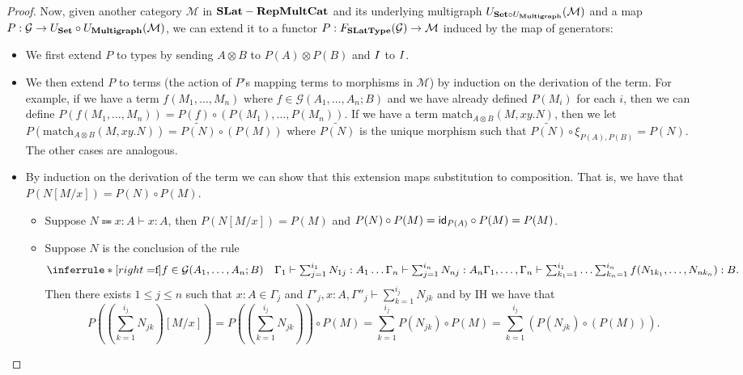 \begin{proof}
Now, given another category $\mathcal{M}$ in $\mathbf{SLat}-\mathbf{RepMultCat}$ and its underlying multigraph $U_{\mathbf{Set} \circ U_{\mathbf{Multigraph}}}(\mathcal{M})$ and a map $P : \mathcal{G} \to U_{\mathbf{Set}} \circ U_{\mathbf{Multigraph}}(\mathcal{M})$,
we can extend it to a functor $P : F_{\mathbf{SLatType}}(\mathcal{G}) \to \mathcal{M}$ induced by the map of generators:
\begin{itemize}
  \item We first extend $P$ to types by sending $A \otimes B$ to $P(A) \otimes P(B)$ and $I$ to $I$.
  \item We then extend $P$ to terms (the action of $P$'s mapping terms to morphisms in $\mathcal{M}$) by induction on the derivation of the term. 
  For example, if we have a term $f(M_1, \ldots, M_n)$ where $f \in \mathcal{G}(A_1, \ldots, A_n;B)$ and we have already defined $P(M_i)$ for each $i$, then we can define $P(f(M_1, \ldots, M_n)) = P(f) \circ (P(M_1), \ldots, P(M_n))$.
  If we have a term $\text{match}_{A \otimes B}(M, xy. N)$, then we let $P(\text{match}_{A \otimes B}(M, xy. N)) = \tilde{P(N)} \circ (P(M))$ where $\widetilde{P(N)}$ is the unique morphism such that $\widetilde{P(N)} \circ \xi_{P(A), P(B)} = P(N)$.
  The other cases are analogous.
  \item By induction on the derivation of the term we can show that this extension maps substitution to composition.
  That is, we have that $P(N[M/x]) = P(N) \circ P(M)$.
  \begin{itemize}
    \item Suppose $N \Coloneqq x : A \vdash x : A$, then $P(N[M/x]) = P(M)$ and $P(N) \circ P(M) = \textsf{id}_{P(A)} \circ P(M) = P(M)$.
    \item Suppose $N$ is the conclusion of the rule
    \[
      \inferrule*[right=$f$]{f \in \mathcal{G}(A_1,\ldots,A_n;B) \quad \Gamma_1 \vdash \sum_{j=1}^{i_1} N_{1j} : A_1 \ldots \Gamma_n \vdash \sum_{j=1}^{i_n} N_{nj} : A_n}{\Gamma_1, \ldots, \Gamma_n \vdash \sum_{k_1 = 1}^{i_1} \ldots \sum_{k_n=1}^{i_n} f(N_{1 k_1}, \ldots, N_{n k_n}) : B}.
    \] 
    Then there exists $1 \leq j \leq n$ such that $x : A \in \Gamma_j$ and $\Gamma'_j, x : A, \Gamma''_j \vdash \sum_{k=1}^{i_j} N_{j k}$ and by IH we have that 
    \[
    P((\sum_{k=1}^{i_j} N_{j k})[M/x]) = P((\sum_{k=1}^{i_j} N_{j k})) \circ P(M) = \sum_{k=1}^{i_j} P(N_{j k}) \circ P(M) = \sum_{k=1}^{i_j} (P(N_{j k}) \circ (P(M))).
\]
\end{itemize}
\end{itemize}
\end{proof}
